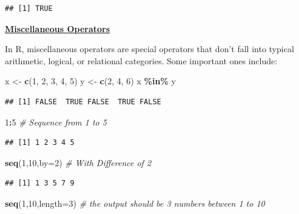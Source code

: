 \documentclass[
]{article}
\newenvironment{Shaded}{\begin{snugshade}}{\end{snugshade}}
\newcommand{\AttributeTok}[1]{\textcolor[rgb]{0.13,0.29,0.53}{#1}}
\newcommand{\CommentTok}[1]{\textcolor[rgb]{0.56,0.35,0.01}{\textit{#1}}}
\newcommand{\DecValTok}[1]{\textcolor[rgb]{0.00,0.00,0.81}{#1}}
\newcommand{\FunctionTok}[1]{\textcolor[rgb]{0.13,0.29,0.53}{\textbf{#1}}}
\newcommand{\NormalTok}[1]{#1}
\newcommand{\OtherTok}[1]{\textcolor[rgb]{0.56,0.35,0.01}{#1}}
\newcommand{\SpecialCharTok}[1]{\textcolor[rgb]{0.81,0.36,0.00}{\textbf{#1}}}
\begin{document}
\begin{verbatim}
## [1] TRUE
\end{verbatim}

\ul{\textbf{Miscellaneous Operators}}

In R, miscellaneous operators are special operators that don't fall into
typical arithmetic, logical, or relational categories. Some important
ones include:

\begin{Shaded}
\begin{Highlighting}[]
\NormalTok{ x }\OtherTok{\textless{}{-}} \FunctionTok{c}\NormalTok{(}\DecValTok{1}\NormalTok{, }\DecValTok{2}\NormalTok{, }\DecValTok{3}\NormalTok{, }\DecValTok{4}\NormalTok{, }\DecValTok{5}\NormalTok{)}
\NormalTok{y }\OtherTok{\textless{}{-}} \FunctionTok{c}\NormalTok{(}\DecValTok{2}\NormalTok{, }\DecValTok{4}\NormalTok{, }\DecValTok{6}\NormalTok{)}
\NormalTok{x }\SpecialCharTok{\%in\%}\NormalTok{ y}
\end{Highlighting}
\end{Shaded}

\begin{verbatim}
## [1] FALSE  TRUE FALSE  TRUE FALSE
\end{verbatim}

\begin{Shaded}
\begin{Highlighting}[]
\DecValTok{1}\SpecialCharTok{:}\DecValTok{5} \CommentTok{\# Sequence from 1 to 5}
\end{Highlighting}
\end{Shaded}

\begin{verbatim}
## [1] 1 2 3 4 5
\end{verbatim}

\begin{Shaded}
\begin{Highlighting}[]
\FunctionTok{seq}\NormalTok{(}\DecValTok{1}\NormalTok{,}\DecValTok{10}\NormalTok{,}\AttributeTok{by=}\DecValTok{2}\NormalTok{) }\CommentTok{\# With Difference of 2}
\end{Highlighting}
\end{Shaded}

\begin{verbatim}
## [1] 1 3 5 7 9
\end{verbatim}

\begin{Shaded}
\begin{Highlighting}[]
\FunctionTok{seq}\NormalTok{(}\DecValTok{1}\NormalTok{,}\DecValTok{10}\NormalTok{,}\AttributeTok{length=}\DecValTok{3}\NormalTok{) }\CommentTok{\# the output should be 3 numbers between 1 to 10  }
\end{Highlighting}
\end{Shaded}
\end{document}
